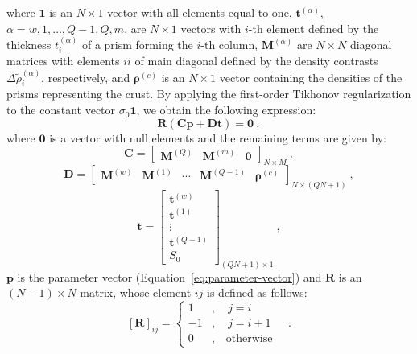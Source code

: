 \documentclass[manuscript]{geophysics}
\begin{document}
where $\mathbf{1}$ is an $N \times 1$ vector with all elements equal to one, 
$\mathbf{t}^{(\alpha)}$, $\alpha = w, 1, \dots, Q-1, Q, m$, are $N \times 1$ vectors
with $i$-th element defined by the thickness $t^{(\alpha)}_{i}$ of a prism forming the
$i$-th column, $\mathbf{M}^{(\alpha)}$ are $N \times N$ diagonal matrices with elements
$ii$ of main diagonal defined by the density contrasts 
$\Delta \tilde{\rho}^{(\alpha)}_{i}$, respectively, and $\boldsymbol{\rho}^{(c)}$ is an 
$N \times 1$ vector containing the densities of the prisms
representing the crust. By applying the first-order Tikhonov regularization
\citep{aster-etal2005} to the constant vector $\sigma_{0} \mathbf{1}$, we obtain the
following expression:
\begin{equation}
\mathbf{R} \left( \mathbf{C} \mathbf{p} + \mathbf{D} \mathbf{t} \right) = \mathbf{0} 
\: ,
\label{eq:tik1-lithostatic-stress}
\end{equation}
where $\mathbf{0}$ is a vector with null elements and the remaining terms are given by:
\begin{equation}
\mathbf{C} = \begin{bmatrix}
\mathbf{M}^{(Q)} & \mathbf{M}^{(m)} & \mathbf{0}
\end{bmatrix}_{N \times M} \: ,
\label{eq:matrix-C}
\end{equation}
\begin{equation}
\mathbf{D} = \begin{bmatrix}
\mathbf{M}^{(w)} & \mathbf{M}^{(1)} & \cdots & \mathbf{M}^{(Q-1)} &
\boldsymbol{\rho}^{(c)}
\end{bmatrix}_{N \times \left( QN + 1 \right)} \: ,
\label{eq:matrix-D}
\end{equation}
\begin{equation}
\mathbf{t} = \begin{bmatrix}
\mathbf{t}^{(w)} \\ \mathbf{t}^{(1)} \\ \vdots \\ \mathbf{t}^{(Q-1)} \\ S_{0}
\end{bmatrix}_{\left( QN + 1 \right) \times 1}\: ,
\label{eq:vector-t}
\end{equation}
$\mathbf{p}$ is the parameter vector (Equation~\ref{eq:parameter-vector}) and
$\mathbf{R}$ is an $\left( N-1 \right) \times N$ matrix, whose element $ij$ is defined
as follows:
\begin{equation}
\left[ \mathbf{R} \right]_{ij} = \begin{cases}
1 &, \quad j = i \\
-1 &, \quad j = i + 1 \\
0 &, \quad \text{otherwise}
\end{cases} \quad .
\label{eq:matrix-R}
\end{equation}
\end{document}
